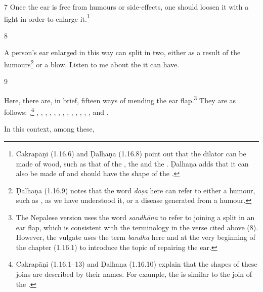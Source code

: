 \begin{translation}
    \item[7]
    Once the ear is free from humours or side-effects, one should 
    loosen it with a light  in order to enlarge it.\footnote{Cakrapāṇi (1.16.6) and Ḍalhaṇa (1.16.8) point out that the dilator can be made of wood, such as that of the , the  and the . Ḍalhaṇa adds that it can also be made of  and should have the shape of the .}
    
    \item[8]
    
    \begin{sloka}

A person's ear enlarged in this way can split in two, either as a result of the humours\footnote{Ḍalhaṇa (1.16.9) notes that the word \emph{doṣa} here can refer to either a humour, such as , as we have understood it, or a disease generated from a humour.} or a blow. Listen to me about the  it can have.
        
    \end{sloka}
    
        \item[9]
    
Here, there are, in brief, fifteen ways of mending the ear flap.\footnote{The Nepalese version uses the word \emph{sandhāna} to refer to joining a split in an ear flap, which is consistent with the terminology in the verse cited above (8). However, the vulgate uses the term \emph{bandha} here and at the very beginning of the chapter (1.16.1) to introduce the topic of repairing the ear.}  They are as follows:
    ,\footnote{Cakrapāṇi (1.16.1–13) and Ḍalhaṇa (1.16.10) explain that the shapes of these joins are described by their names. For example, the  is similar to the join of the .} , , , , , , , , , 
    , ,
    , , and .
    
    In this context, among these, 
    \begin{description}
        

\end{description}
\end{translation}
